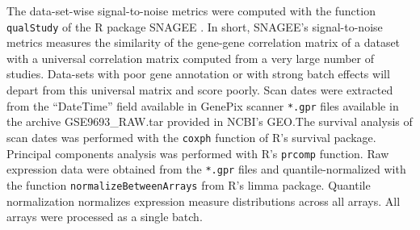 The data-set-wise signal-to-noise metrics were computed with the function
\texttt{qualStudy} of the \textsf{R} package \textsf{SNAGEE}
\cite{venet_measure_2012}.  In short, \textsf{SNAGEE}'s signal-to-noise metrics
measures the similarity of the gene-gene correlation matrix of a dataset with a
universal correlation matrix computed from a very large number of studies.
Data-sets with poor gene annotation or with strong batch effects will depart
from this universal matrix and score poorly.  Scan dates were extracted from the
``DateTime'' field available in GenePix scanner \texttt{*.gpr} files available
in the archive \textsf{GSE9693\_RAW.tar} provided in NCBI's GEO.\@ The survival
analysis of scan dates was performed with the \texttt{coxph} function of
\textsf{R}'s \textsf{survival} package.  Principal components analysis was
performed with \textsf{R}'s \texttt{prcomp} function.  Raw expression data were
obtained from the \texttt{*.gpr} files and quantile-normalized with the function
\texttt{normalizeBetweenArrays} from \textsf{R}'s \textsf{limma} package.
Quantile normalization normalizes expression measure distributions across all
arrays.  All arrays were processed as a single batch.

